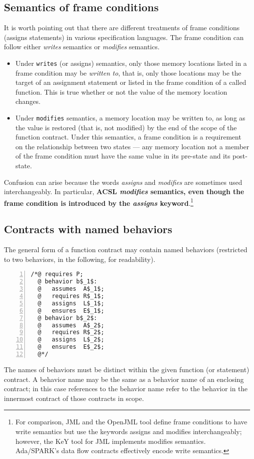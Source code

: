 \subsection{Semantics of frame conditions}
\label{sec:writesSemantics}
It is worth pointing out that there are different treatments of
frame conditions (assigns statements) in various specification languages.
The frame condition can follow either \emph{writes} semantics or \emph{modifies} semantics.
\begin{itemize}
	\item Under \lstinline|writes| (or assigns) semantics, only those memory locations listed in a frame condition may be \emph{written to}, that is, only those locations may be the target of an assignment statement or listed in the frame condition of a called function. This is true whether or not the value of the memory location changes.
	\item Under \lstinline|modifies| semantics, a memory location may be written to, as long as the value is restored (that is, not modified) by the end of the scope of the function contract. Under this semantics, a frame condition is a requirement on the relationship between two states --- any memory location not a member of the frame condition must have the same value in its pre-state and its post-state.
\end{itemize}
Confusion can arise because the words \emph{assigns} and \emph{modifies} are sometimes used interchangeably. In particular, \textbf{ACSL  \iftoggle{isCPP}{use}{uses}
	\emph{modifies} semantics, even though the frame condition is introduced by the \emph{assigns} keyword}.\footnote{For comparison, JML and the OpenJML tool define frame conditions to have write semantics but use the keywords assigns and modifies interchangeably; however, the KeY tool for JML implements modifies semantics. Ada/SPARK's data flow contracts effectively encode write semantics.}

\subsection{Contracts with named behaviors}
\label{subsec:behaviors}
The general form of a function contract may contain named
behaviors (restricted to two behaviors, in the following, for
readability).
\lstset{firstnumber=auto}
\begin{lstlisting}[style=c,basicstyle=\lp@basic,numbers=left,name=behaviors]
/*@ requires P;
  @ behavior b$_1$:
  @   assumes  A$_1$;
  @   requires R$_1$;
  @   assigns  L$_1$;
  @   ensures  E$_1$;
  @ behavior b$_2$:
  @   assumes  A$_2$;
  @   requires R$_2$;
  @   assigns  L$_2$;
  @   ensures  E$_2$;
  @*/
\end{lstlisting}
The names of behaviors must be distinct within the given function (or statement) contract. A behavior name may be the same as a behavior name 
of an enclosing contract; in this case references to the behavior name 
refer to the behavior in the innermost contract of those contracts in scope.

